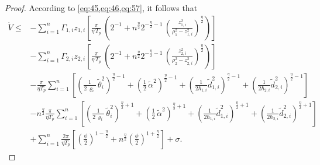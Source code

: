 \documentclass[pdflatex,sn-mathphys-num]{sn-jnl}%
\theoremstyle{thmstyleone}%
\theoremstyle{thmstyletwo}%
\theoremstyle{thmstylethree}%
\begin{document}
\begin{proof}
According to \cref{eq:45,eq:46,eq:57}, it follows that
\begin{equation}\label{eq:58}
	\begin{aligned}
		\dot{V} \le& - \sum_{i=1}^{n}\varGamma_{1,i}z_{1,i}\left[\frac{\pi}{\eta\,T_p}\,
		\left( 2^{-1}+n^{\frac\eta2} 2^{-\tfrac\eta2 -1}\,\left(\frac{z_{1,i}^2}{\rho_{1}^2 - z_{1,i}^2}\right)^{\frac{\eta}{2}}\right)  \right]    \\
		&                      
		- \sum_{i=1}^{n}\varGamma_{2,i}z_{2,i}\left[\frac{\pi}{\eta\,T_p}\,
		 \left( 2^{-1}+n^{\frac\eta2} 2^{-\tfrac\eta2 -1}\,\left(\frac{z_{2,i}^2}{\rho_{2}^2 - z_{2,i}^2}\right)^{\frac{\eta}{2}}\right)  \right]\\
	&-\frac{\pi}{\eta T_{p}}\sum_{i=1}^{n}\left[ \left(\frac{1}{2\,\varrho_i}\,\tilde \theta_{i}^2\right)^{\frac{\eta}{2}-1}+\left(\frac{1}{2}\,{\tilde{\alpha}}^2\right)^{\frac{\eta}{2}-1}+\left(\frac{1}{2\hbar_{1,i}}{\tilde d}^2_{1,i}\right)^{\frac{\eta}{2}-1}+\left(\frac{1}{2\hbar_{2,i}}{\tilde d}^2_{2,i}\right)^{\frac{\eta}{2}-1}\right] \\
		        & - n^{\frac\eta2}\frac{\pi}{\eta T_{p}}\sum_{i=1}^{n}\left[
		\left(\frac{1}{2\,\varrho_i}\,\tilde \theta_{i}^2\right)^{\frac{\eta}{2}+1}+\left(\frac{1}{2}\,{\tilde{\alpha}}^2\right)^{\frac{\eta}{2}+1}+\left(\frac{1}{2\hbar_{1,i}}{\tilde d}^2_{1,i}\right)^{\frac{\eta}{2}+1}+\left(\frac{1}{2\hbar_{2,i}}{\tilde d}^2_{2,i}\right)^{\frac{\eta}{2}+1} \right]   \\
		&        
		+\sum_{i=1}^{n}\frac{2\pi}{\eta T_{p}} \left[  \left(\frac{\phi}{2}\right)^{1-\frac{\eta}{2}} + n^{\frac\eta2}\left(\frac{\phi}{2}\right)^{1+\frac{\eta}{2}}  \right]+\sigma  .                  
	\end{aligned}
\end{equation}



\end{proof}
\end{document}
